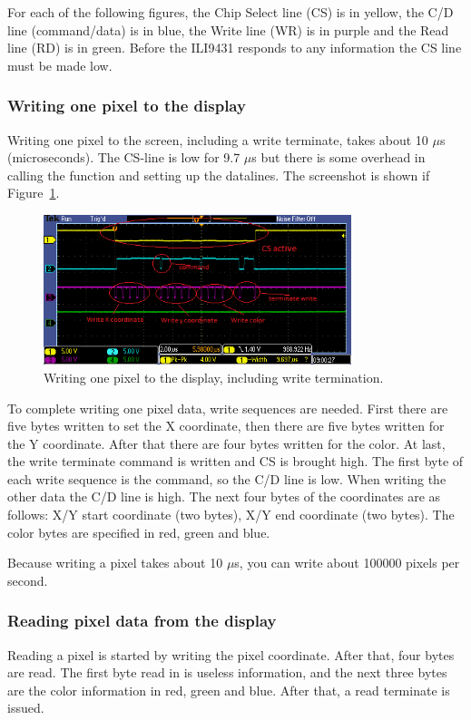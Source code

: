 \documentclass[12pt]{article}
\begin{document}
For each of the following figures, the Chip Select line (CS) is in yellow, the C/D line (command/data) is in blue, the Write line (WR) is in purple and the Read line (RD) is in green. Before the ILI9431 responds to any information the CS line must be made low.

\subsubsection{Writing one pixel to the display}
Writing one pixel to the screen, including a write terminate, takes about 10 $\mu$s (microseconds). The CS-line is low for 9.7 $\mu$s but there is some overhead in calling the function and setting up the datalines. The screenshot is shown if Figure~\ref{fig:10}.

\begin{figure}[!ht]
\centering
\includegraphics[width=0.8\textwidth]{pixel_write}
\caption{Writing one pixel to the display, including write termination.}
\label{fig:10}
\end{figure}

To complete writing one pixel data, write sequences are needed.
First there are five bytes written to set the X coordinate, then there are five bytes written for the Y coordinate. After that there are four bytes written for the color. At last, the write terminate command is written and CS is brought high. The first byte of each write sequence is the command, so the C/D line is low. When writing the other data the C/D line is high. The next four bytes of the coordinates are as follows: X/Y start coordinate (two bytes), X/Y end coordinate (two bytes). The color bytes are specified in red, green and blue.

Because writing a pixel takes about 10 $\mu$s, you can write about 100000 pixels per second.

\subsubsection{Reading pixel data from the display}
Reading a pixel is started by writing the pixel coordinate. After that, four bytes are read. The first byte read in is useless information, and the next three bytes are the color information in red, green and blue. After that, a read terminate is issued.
\end{document}
